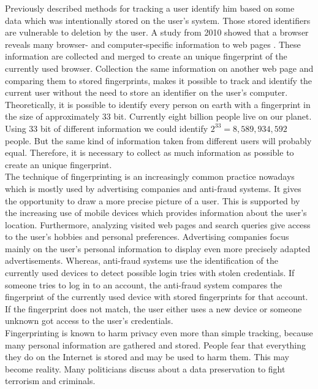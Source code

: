 \documentclass[article,colorback,accentcolor=tud9c,type=bsc]{tudthesis}
\begin{document}
	Previously described methods for tracking a user identify him based on some data which was intentionally stored on the user's system. Those stored identifiers are vulnerable to deletion by the user. A study from 2010 showed that a browser reveals many browser- and computer-specific information to web pages \cite{Eckersley:2010:UYW:1881151.1881152}. These information are collected and merged to create an unique fingerprint of the currently used browser. Collection the same information on another web page and comparing them to stored fingerprints, makes it possible to track and identify the current user without the need to store an identifier on the user's computer. Theoretically, it is possible to identify every person on earth with a fingerprint in the size of approximately 33 bit. Currently eight billion people live on our planet. Using 33 bit of different information we could identify $2^{33}=8,589,934,592$ people. But the same kind of information taken from different users will probably equal. Therefore, it is necessary to collect as much information as possible to create an unique fingerprint. \\
	
	The technique of fingerprinting is an increasingly common practice nowadays which is mostly used by advertising companies and anti-fraud systems. It gives the opportunity to draw a more precise picture of a user. This is supported by the increasing use of mobile devices which provides information about the user's location. Furthermore, analyzing visited web pages and search queries give access to the user's hobbies and personal preferences. Advertising companies focus mainly on the user's personal information to display even more precisely adapted advertisements. Whereas, anti-fraud systems use the identification of the currently used devices to detect possible login tries with stolen credentials. If someone tries to log in to an account, the anti-fraud system compares the fingerprint of the currently used device with stored fingerprints for that account. If the fingerprint does not match, the user either uses a new device or someone unknown got access to the user's credentials. \\
	
	Fingerprinting is known to harm privacy even more than simple tracking, because many personal information are gathered and stored. People fear that everything they do on the Internet is stored and may be used to harm them. This may become reality. Many politicians discuss about a data preservation to fight terrorism and criminals. 
	
\end{document}
